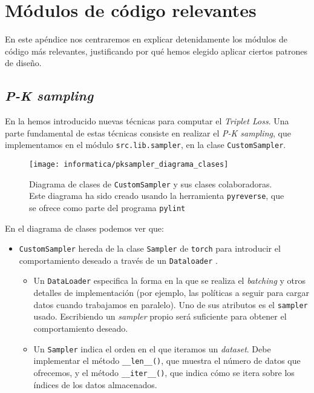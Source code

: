 \chapter{Módulos de código relevantes} \label{apendix:modulos_codigo}

En este apéndice nos centraremos en explicar detenidamente los módulos de código más relevantes, justificando por qué hemos elegido aplicar ciertos patrones de diseño.

\section{\textit{P-K sampling}}

En la  hemos introducido nuevas técnicas para computar el \textit{Triplet Loss}. Una parte fundamental de estas técnicas consiste en realizar el \textit{P-K sampling}, que implementamos en el módulo \lstinline{src.lib.sampler}, en la clase \lstinline{CustomSampler}.

\begin{figure}[H]
	\centering
	\texttt{[image: informatica/pksampler\_diagrama\_clases]}
	\caption{Diagrama de clases de \lstinline{CustomSampler} y sus clases colaboradoras. Este diagrama ha sido creado usando la herramienta \lstinline{pyreverse}, que se ofrece como parte del programa \lstinline{pylint}}
	\label{img:diagrama_clases_CustomSampler}
\end{figure}

En el diagrama de clases  podemos ver que:

\begin{itemize}
	\item \lstinline{CustomSampler} hereda de la clase \lstinline{Sampler} de \lstinline{torch} para introducir el comportamiento deseado a través de un \lstinline{Dataloader} \cite{informatica:pytorch_sampler}.
	      \begin{itemize}
		      \item Un \lstinline{DataLoader} especifica la forma en la que se realiza el \textit{batching} y otros detalles de implementación (por ejemplo, las políticas a seguir para cargar datos cuando trabajamos en paralelo). Uno de sus atributos es el \lstinline{sampler} usado. Escribiendo un \textit{sampler} propio será suficiente para obtener el comportamiento deseado.
		      \item Un \lstinline{Sampler} indica el orden en el que iteramos un \textit{dataset}. Debe implementar el método \lstinline{__len__()}, que muestra el número de datos que ofrecemos, y el método \lstinline{__iter__()}, que indica cómo se itera sobre los índices de los datos almacenados.
	      \end{itemize}
\end{itemize}

